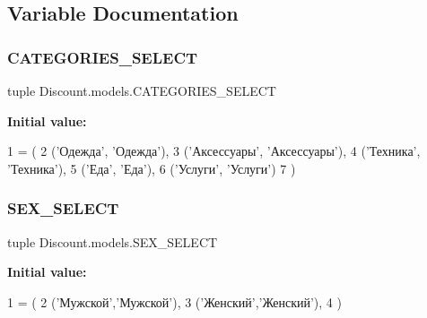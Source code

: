 \subsection{Variable Documentation}
\mbox{\label{namespace_discount_1_1models_a125399ca6dffacd93430a3418d3f39bb}} 
\subsubsection{\texorpdfstring{C\+A\+T\+E\+G\+O\+R\+I\+E\+S\+\_\+\+S\+E\+L\+E\+CT}{CATEGORIES\_SELECT}}
{\footnotesize\ttfamily tuple Discount.\+models.\+C\+A\+T\+E\+G\+O\+R\+I\+E\+S\+\_\+\+S\+E\+L\+E\+CT}

{\bfseries Initial value\+:}
\begin{DoxyCode}
1 =  (
2     (\textcolor{stringliteral}{'Одежда'}, \textcolor{stringliteral}{'Одежда'}),
3     (\textcolor{stringliteral}{'Аксессуары'}, \textcolor{stringliteral}{'Аксессуары'}),
4     (\textcolor{stringliteral}{'Техника'}, \textcolor{stringliteral}{'Техника'}),
5     (\textcolor{stringliteral}{'Еда'}, \textcolor{stringliteral}{'Еда'}),
6     (\textcolor{stringliteral}{'Услуги'}, \textcolor{stringliteral}{'Услуги'})
7 )
\end{DoxyCode}
\mbox{\label{namespace_discount_1_1models_a9696923b818a8cfb7e050ee4a8413053}} 
\subsubsection{\texorpdfstring{S\+E\+X\+\_\+\+S\+E\+L\+E\+CT}{SEX\_SELECT}}
{\footnotesize\ttfamily tuple Discount.\+models.\+S\+E\+X\+\_\+\+S\+E\+L\+E\+CT}

{\bfseries Initial value\+:}
\begin{DoxyCode}
1 =  (
2     (\textcolor{stringliteral}{'Мужской'},\textcolor{stringliteral}{'Мужской'}),
3     (\textcolor{stringliteral}{'Женский'},\textcolor{stringliteral}{'Женский'}),
4 )
\end{DoxyCode}
\mbox{\label{namespace_discount_1_1models_a8d71c5509c24914255117f46069cb170}} 
